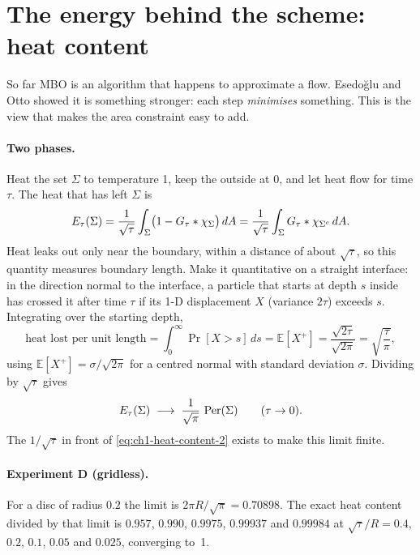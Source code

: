 \section{The energy behind the scheme: heat content}
\label{sec:ch1-energy}

So far MBO is an algorithm that happens to approximate a flow. Esedo\u{g}lu and
Otto \cite{esedoglu2015threshold} showed it is something stronger: each step
\emph{minimises} something. This is the view that makes the area constraint easy
to add.

\paragraph{Two phases.}
Heat the set $\Sigma$ to temperature 1, keep the outside at 0, and let heat flow
for time $\tau$. The heat that has left $\Sigma$ is
\begin{equation}
  E_\tau(\Sigma) = \frac{1}{\sqrt\tau} \int_\Sigma \bigl(1 - G_\tau * \chi_\Sigma\bigr)\, dA
               = \frac{1}{\sqrt\tau} \int_{\Sigma} G_\tau * \chi_{\Sigma^c}\, dA .
  \label{eq:ch1-heat-content-2}
\end{equation}
Heat leaks out only near the boundary, within a distance of about $\sqrt\tau$, so
this quantity measures boundary length. Make it quantitative on a straight
interface: in the direction normal to the interface, a particle that starts at
depth $s$ inside has crossed it after time $\tau$ if its 1-D displacement $X$
(variance $2\tau$) exceeds $s$. Integrating over the starting depth,
\[
  \text{heat lost per unit length}
  = \int_0^\infty \Pr[X > s]\, ds = \mathbb E[X^+]
  = \frac{\sqrt{2\tau}}{\sqrt{2\pi}} = \sqrt{\frac{\tau}{\pi}} ,
\]
using $\mathbb E[X^+] = \sigma/\sqrt{2\pi}$ for a centred normal with standard
deviation $\sigma$. Dividing by $\sqrt\tau$ gives
\begin{equation}
  E_\tau(\Sigma) \;\longrightarrow\; \frac{1}{\sqrt\pi}\, \operatorname{Per}(\Sigma)
  \qquad (\tau \to 0).
  \label{eq:ch1-limit}
\end{equation}
The $1/\sqrt\tau$ in front of \eqref{eq:ch1-heat-content-2} exists to make this
limit finite.

\paragraph{Experiment D (gridless).}
For a disc of radius $0.2$ the limit is $2\pi R/\sqrt\pi = 0.70898$. The exact heat
content divided by that limit is $0.957$, $0.990$, $0.9975$, $0.99937$ and
$0.99984$ at $\sqrt\tau/R = 0.4$, $0.2$, $0.1$, $0.05$ and $0.025$, converging
to~1.

